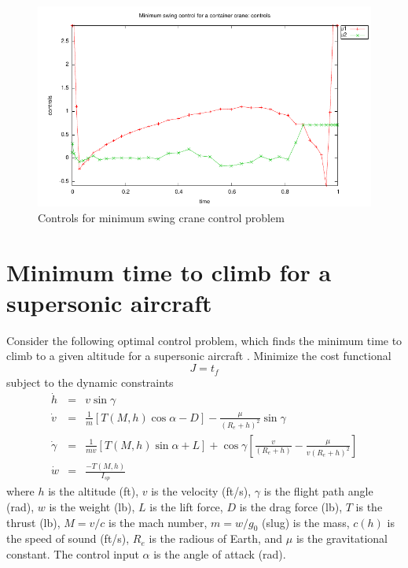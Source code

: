 \documentclass[a4paper,11pt]{report}    %
\begin{document}
\begin{figure}
  \centering
  \includegraphics{../examples/crane/crane_controls}
  \caption{Controls for minimum swing crane control problem}
 \label{fig:crane_controls}
\end{figure}



\section{Minimum time to climb for a supersonic aircraft}


Consider the following optimal control problem, which finds the minimum time
to climb to a given altitude for a supersonic aircraft \cite{Betts:10}.  Minimize the cost functional
\begin{equation}
  J = t_f
\end{equation}
subject to the dynamic constraints
\begin{equation}
  \begin{array}{lcl}
    \dot h & = & v \sin \gamma \\
    \dot v & = & \frac{1}{m}\left[ T(M,h) \cos \alpha - D \right] - \frac{\mu}{(R_e+h)^2}\sin \gamma \\
    \dot \gamma & = & \frac{1}{m v}\left[ T(M,h) \sin \alpha + L \right] + \cos{\gamma} \left[ \frac{v}{(R_e+h)} - \frac{\mu}{v(R_e+h)^2} \right]\\
    \dot w &=& \frac{-T(M,h)}{I_{sp}}
  \end{array}
\end{equation}
where $h$ is the altitude (ft), $v$ is the velocity (ft/s),  $\gamma$ is the flight path
angle (rad), $w$ is the weight (lb), $L$ is the lift force, $D$ is the drag force (lb), $T$
is the thrust (lb), $M = v/c$ is the mach number, $m = w/g_0$ (slug) is the mass, $c(h)$ is the speed of
sound (ft/s), $R_e$ is the radious of Earth, and $\mu$ is the gravitational constant. The control input $\alpha$ is the angle of attack (rad). 
\end{document}
